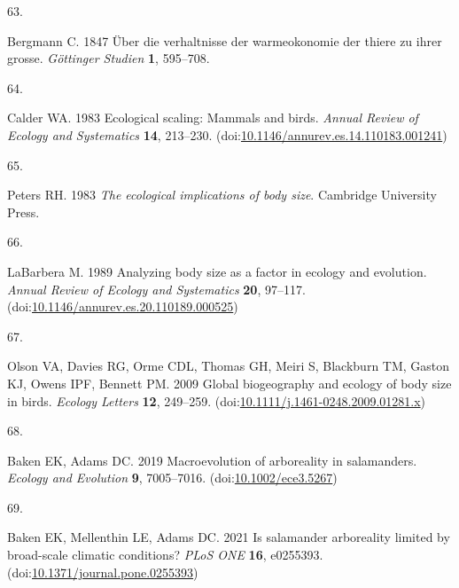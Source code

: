 \documentclass[
  11pt,
]{article}
\newlength{\cslhangindent}
\newlength{\csllabelwidth}
\newlength{\cslentryspacingunit} %
\newenvironment{CSLReferences}[2] %
 {%
  \setlength{\parindent}{0pt}
  \ifodd #1
  \let\oldpar\par
  \def\par{\hangindent=\cslhangindent\oldpar}
  \fi
  \setlength{\parskip}{#2\cslentryspacingunit}
 }%
 {}
\newcommand{\CSLLeftMargin}[1]{\parbox[t]{\csllabelwidth}{#1}}
\newcommand{\CSLRightInline}[1]{\parbox[t]{\linewidth - \csllabelwidth}{#1}\break}
\begin{document}
\begin{CSLReferences}{0}{0}
\leavevmode{}%
\CSLLeftMargin{63. }%
\CSLRightInline{Bergmann C. 1847 {Ü}ber die verhaltnisse der
warmeokonomie der thiere zu ihrer grosse. \emph{G{ö}ttinger Studien}
\textbf{1}, 595--708.}

\leavevmode{}%
\CSLLeftMargin{64. }%
\CSLRightInline{Calder WA. 1983 Ecological scaling: Mammals and birds.
\emph{Annual Review of Ecology and Systematics} \textbf{14}, 213--230.
(doi:\href{https://doi.org/10.1146/annurev.es.14.110183.001241}{10.1146/annurev.es.14.110183.001241})}

\leavevmode{}%
\CSLLeftMargin{65. }%
\CSLRightInline{Peters RH. 1983 \emph{The ecological implications of
body size}. Cambridge University Press. }

\leavevmode{}%
\CSLLeftMargin{66. }%
\CSLRightInline{LaBarbera M. 1989 Analyzing body size as a factor in
ecology and evolution. \emph{Annual Review of Ecology and Systematics}
\textbf{20}, 97--117.
(doi:\href{https://doi.org/10.1146/annurev.es.20.110189.000525}{10.1146/annurev.es.20.110189.000525})}

\leavevmode{}%
\CSLLeftMargin{67. }%
\CSLRightInline{Olson VA, Davies RG, Orme CDL, Thomas GH, Meiri S,
Blackburn TM, Gaston KJ, Owens IPF, Bennett PM. 2009 Global biogeography
and ecology of body size in birds. \emph{Ecology Letters} \textbf{12},
249--259.
(doi:\href{https://doi.org/10.1111/j.1461-0248.2009.01281.x}{10.1111/j.1461-0248.2009.01281.x})}

\leavevmode{}%
\CSLLeftMargin{68. }%
\CSLRightInline{Baken EK, Adams DC. 2019 Macroevolution of arboreality
in salamanders. \emph{Ecology and Evolution} \textbf{9}, 7005--7016.
(doi:\href{https://doi.org/10.1002/ece3.5267}{10.1002/ece3.5267})}

\leavevmode{}%
\CSLLeftMargin{69. }%
\CSLRightInline{Baken EK, Mellenthin LE, Adams DC. 2021 Is salamander
arboreality limited by broad-scale climatic conditions? \emph{PLoS ONE}
\textbf{16}, e0255393.
(doi:\href{https://doi.org/10.1371/journal.pone.0255393}{10.1371/journal.pone.0255393})}

\end{CSLReferences}

\newpage

\hfill\break
\end{document}
